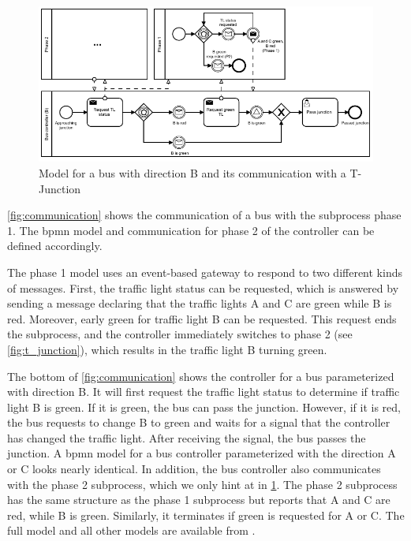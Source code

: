 \documentclass{jot}
\begin{document}
\begin{figure}[ht]
    \centering
    \includegraphics[width=1\textwidth]{figures/communication.pdf}
    \caption{Model for a bus with direction B and its communication with a T-Junction}
    \label{fig:communication}
\end{figure}

\autoref{fig:communication} shows the communication of a bus with the subprocess phase 1.
The \gls*{bpmn} model and communication for phase 2 of the controller can be defined accordingly.

The phase 1 model uses an event-based gateway to respond to two different kinds of messages.
First, the traffic light status can be requested, which is answered by sending a message declaring that the traffic lights A and C are green while B is red.
Moreover, early green for traffic light B can be requested.
This request ends the subprocess, and the controller immediately switches to phase 2 (see \cref{fig:t_junction}), which results in the traffic light B turning green.

The bottom of \autoref{fig:communication} shows the controller for a bus parameterized with direction B.
It will first request the traffic light status to determine if traffic light B is green.
If it is green, the bus can pass the junction.
However, if it is red, the bus requests to change B to green and waits for a signal that the controller has changed the traffic light.
After receiving the signal, the bus passes the junction.
A \gls*{bpmn} model for a bus controller parameterized with the direction A or C looks nearly identical.
In addition, the bus controller also communicates with the phase 2 subprocess, which we only hint at in \cref{fig:communication}.
The phase 2 subprocess has the same structure as the phase 1 subprocess but reports that A and C are red, while B is green.
Similarly, it terminates if green is requested for A or C.
The full model and all other models are available from \cite{krauterArtifactsBehavioralConsistency2022}.
\end{document}
